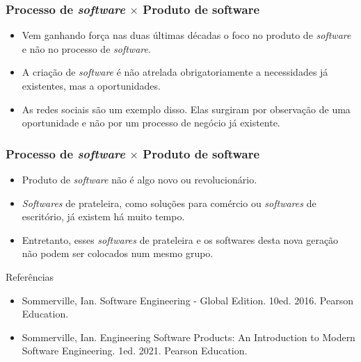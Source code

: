 \documentclass[11pt]{beamer}
\begin{document}
    \begin{frame}
      \frametitle{Processo de \textit{software} $\times$ Produto de software}
      \begin{itemize}
        \item Vem ganhando força nas duas últimas décadas o foco no produto de \textit{software} e não no processo de \textit{software}.
        \item A criação de \textit{software} é não atrelada obrigatoriamente a necessidades já existentes, mas a oportunidades.
        \item As redes sociais são um exemplo disso. Elas surgiram por observação de uma oportunidade e não por um processo de negócio já existente.
      \end{itemize}
    \end{frame}

    \begin{frame}
      \frametitle{Processo de \textit{software} $\times$ Produto de software}
      \begin{itemize}
        \item Produto de \textit{software} não é algo novo ou revolucionário.
        \item \textit{Softwares} de prateleira, como soluções para comércio ou \textit{softwares} de escritório, já existem há muito tempo.
        \item Entretanto, esses \textit{softwares} de prateleira e os softwares desta nova geração não podem ser colocados num mesmo grupo.
      \end{itemize}
    \end{frame}

    \begin{frame}{Referências}
      \begin{itemize}
          \item Sommerville, Ian. Software Engineering - Global Edition. 10ed. 2016. Pearson Education.
          \item Sommerville, Ian. Engineering Software Products: An Introduction to Modern Software Engineering. 1ed. 2021. Pearson Education. 
      \end{itemize}
    \end{frame}
\end{document}
